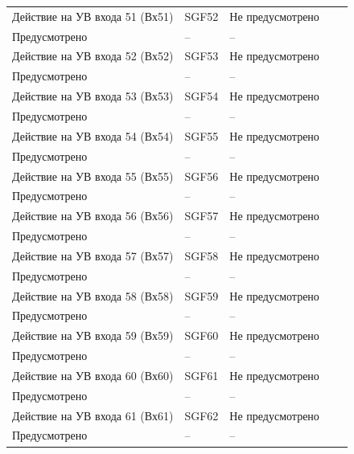 \begin{longtable}{|>{\centering\arraybackslash}m{5.3cm}|>{\centering\arraybackslash}m{3.3cm}|>{\centering\arraybackslash}m{4.2cm}|>{\centering\arraybackslash}m{1.8cm}|>{\centering\arraybackslash}m{1cm}|}
\hline
\centering Действие на УВ входа 51 (Вх51)  & \centering SGF52 & \centering Не предусмотрено \\ Предусмотрено & \centering -- & \centering \arraybackslash -- \\
\hline
\centering Действие на УВ входа 52 (Вх52)  & \centering SGF53 & \centering Не предусмотрено \\ Предусмотрено & \centering -- & \centering \arraybackslash -- \\
\hline
\centering Действие на УВ входа 53 (Вх53)  & \centering SGF54 & \centering Не предусмотрено \\ Предусмотрено & \centering -- & \centering \arraybackslash -- \\
\hline
\centering Действие на УВ входа 54 (Вх54)  & \centering SGF55 & \centering Не предусмотрено \\ Предусмотрено & \centering -- & \centering \arraybackslash -- \\
\hline
\centering Действие на УВ входа 55 (Вх55)  & \centering SGF56 & \centering Не предусмотрено \\ Предусмотрено & \centering -- & \centering \arraybackslash -- \\
\hline
\centering Действие на УВ входа 56 (Вх56)  & \centering SGF57 & \centering Не предусмотрено \\ Предусмотрено & \centering -- & \centering \arraybackslash -- \\
\hline
\centering Действие на УВ входа 57 (Вх57)  & \centering SGF58 & \centering Не предусмотрено \\ Предусмотрено & \centering -- & \centering \arraybackslash -- \\
\hline
\centering Действие на УВ входа 58 (Вх58)  & \centering SGF59 & \centering Не предусмотрено \\ Предусмотрено & \centering -- & \centering \arraybackslash -- \\
\hline
\centering Действие на УВ входа 59 (Вх59)  & \centering SGF60 & \centering Не предусмотрено \\ Предусмотрено & \centering -- & \centering \arraybackslash -- \\
\hline
\centering Действие на УВ входа 60 (Вх60)  & \centering SGF61 & \centering Не предусмотрено \\ Предусмотрено & \centering -- & \centering \arraybackslash -- \\
\hline
\centering Действие на УВ входа 61 (Вх61)  & \centering SGF62 & \centering Не предусмотрено \\ Предусмотрено & \centering -- & \centering \arraybackslash -- \\

\end{longtable}
